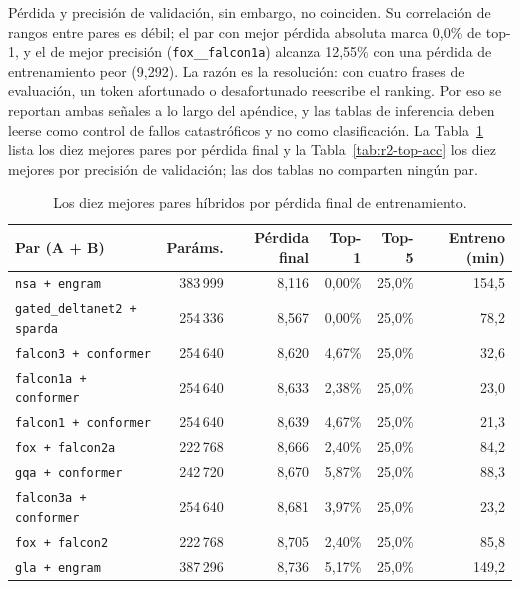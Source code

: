 Pérdida y precisión de validación, sin embargo, no coinciden. Su correlación de rangos entre pares es débil; el par con mejor pérdida absoluta marca 0,0\% de top-1, y el de mejor precisión (\texttt{fox\_\_falcon1a}) alcanza 12,55\% con una pérdida de entrenamiento peor (9,292). La razón es la resolución: con cuatro frases de evaluación, un token afortunado o desafortunado reescribe el ranking. Por eso se reportan ambas señales a lo largo del apéndice, y las tablas de inferencia deben leerse como control de fallos catastróficos y no como clasificación. La Tabla~\ref{tab:r2-top-loss} lista los diez mejores pares por pérdida final y la Tabla~\ref{tab:r2-top-acc} los diez mejores por precisión de validación; las dos tablas no comparten ningún par.

\begin{table}[H]
\centering
\small
\caption{Los diez mejores pares híbridos por pérdida final de entrenamiento.}
\label{tab:r2-top-loss}
\begin{tabular}{lrrrrr}
\toprule
Par (A + B) & Paráms. & Pérdida final & Top-1 & Top-5 & Entreno (min) \\
\midrule
\texttt{nsa + engram}              & 383\,999 & 8,116 & 0,00\% & 25,0\% & 154,5 \\
\texttt{gated\_deltanet2 + sparda} & 254\,336 & 8,567 & 0,00\% & 25,0\% & 78,2 \\
\texttt{falcon3 + conformer}       & 254\,640 & 8,620 & 4,67\% & 25,0\% & 32,6 \\
\texttt{falcon1a + conformer}      & 254\,640 & 8,633 & 2,38\% & 25,0\% & 23,0 \\
\texttt{falcon1 + conformer}       & 254\,640 & 8,639 & 4,67\% & 25,0\% & 21,3 \\
\texttt{fox + falcon2a}            & 222\,768 & 8,666 & 2,40\% & 25,0\% & 84,2 \\
\texttt{gqa + conformer}           & 242\,720 & 8,670 & 5,87\% & 25,0\% & 88,3 \\
\texttt{falcon3a + conformer}      & 254\,640 & 8,681 & 3,97\% & 25,0\% & 23,2 \\
\texttt{fox + falcon2}             & 222\,768 & 8,705 & 2,40\% & 25,0\% & 85,8 \\
\texttt{gla + engram}              & 387\,296 & 8,736 & 5,17\% & 25,0\% & 149,2 \\
\bottomrule
\end{tabular}
\end{table}

